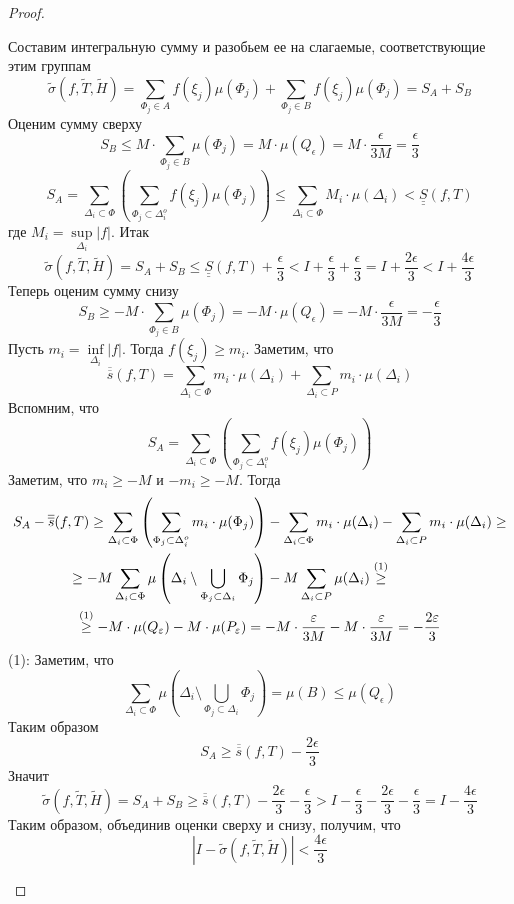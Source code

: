 \begin{proof}
\begin{itemize}
\begin{enumerate}
            \end{enumerate}
            Составим интегральную сумму и разобьем ее на слагаемые, соответствующие этим группам
            \[\widetilde{\sigma}(f, \widetilde{T}, \widetilde{H})=\sum\limits_{\Phi_j\in A} f(\xi_j)\mu(\Phi_j)+\sum\limits_{\Phi_j\in B} f(\xi_j)\mu(\Phi_j)=S_A+S_B\]
            Оценим сумму сверху
            \[S_B\leq M\cdot \sum\limits_{\Phi_j\in B}\mu(\Phi_j)= M\cdot \mu(Q_{\epsilon})=M\cdot \frac{\epsilon}{3M}=\frac{\epsilon}{3}\]
            \[S_A=\sum\limits_{\Delta_i\subset \Phi}\left(\sum\limits_{\Phi_j\subset \Delta_i^o}f(\xi_j)\mu(\Phi_j)\right)\leq \sum\limits_{\Delta_i\subset \Phi}M_i\cdot \mu(\Delta_i)<\underline{\underline{S}}(f,T)\]
            где $M_i=\sup\limits_{\Delta_i} |f|$. Итак
            \[\widetilde{\sigma}(f, \widetilde{T}, \widetilde{H})=S_A+S_B\leq \underline{\underline{S}}(f,T)+\frac{\epsilon}{3}<I+\frac{\epsilon}{3}+\frac{\epsilon}{3}=I+\frac{2\epsilon}{3}<I+\frac{4\epsilon}{3}\]
            Теперь оценим сумму снизу
            \[S_B\geq -M\cdot \sum\limits_{\Phi_j\in B}\mu(\Phi_j)= -M\cdot \mu(Q_{\epsilon})=-M\cdot \frac{\epsilon}{3M}=-\frac{\epsilon}{3}\]
            Пусть $m_i=\inf\limits_{\Delta_i} |f|$. Тогда $f(\xi_j)\geq m_i$. Заметим, что
            \[\overline{\overline{s}}(f,T)=\sum\limits_{\Delta_i\subset\Phi}m_i\cdot \mu(\Delta_i)+\sum\limits_{\Delta_i\subset P}m_i\cdot \mu(\Delta_i)\]
            Вспомним, что
            \[S_A=\sum\limits_{\Delta_i\subset \Phi}\left(\sum\limits_{\Phi_j\subset \Delta_i^o}f(\xi_j)\mu(\Phi_j)\right)\]
            Заметим, что $m_i\geq -M$ и $-m_i\geq -M$. Тогда
            \begin{multline*}
                S_A-\overline{\overline{s}}(f,T)\geq\sum\limits_{\Delta_i\subset \Phi}\left(\sum\limits_{\Phi_j\subset \Delta_i^o}m_i\cdot\mu(\Phi_j)\right)-\sum\limits_{\Delta_i\subset\Phi}m_i\cdot \mu(\Delta_i)-\sum\limits_{\Delta_i\subset P}m_i\cdot \mu(\Delta_i)\geq\\
                \geq -M \sum\limits_{\Delta_i\subset \Phi}\mu\left(\Delta_i\setminus \bigcup\limits_{\Phi_j\subset \Delta_i}\Phi_j\right)-M\sum\limits_{\Delta_i\subset P}\mu(\Delta_i)\overset{(1)}{\geq}\tab[1.5cm]\\
                \overset{(1)}{\geq}-M\cdot \mu(Q_{\epsilon})-M\cdot \mu(P_{\epsilon})=-M\cdot \frac{\epsilon}{3M}-M\cdot \frac{\epsilon}{3M}=-\frac{2\epsilon}{3}
            \end{multline*}
            (1): Заметим, что
            \[\sum\limits_{\Delta_i\subset \Phi}\mu\left(\Delta_i\setminus \bigcup\limits_{\Phi_j\subset \Delta_i}\Phi_j\right)=\mu(B)\leq\mu(Q_{\epsilon})\]
            Таким образом
            \[S_A\geq \overline{\overline{s}}(f,T)-\frac{2\epsilon}{3}\]
            Значит
            \[\widetilde{\sigma}(f, \widetilde{T}, \widetilde{H})=S_A+S_B\geq \overline{\overline{s}}(f,T)-\frac{2\epsilon}{3}-\frac{\epsilon}{3}>I-\frac{\epsilon}{3}-\frac{2\epsilon}{3}-\frac{\epsilon}{3}=I-\frac{4\epsilon}{3}\]
            Таким образом, объединив оценки сверху и снизу, получим, что
            \[|I-\widetilde{\sigma}(f, \widetilde{T}, \widetilde{H})|<\frac{4\epsilon}{3}\]
    \end{itemize}
\end{proof}
\newpage